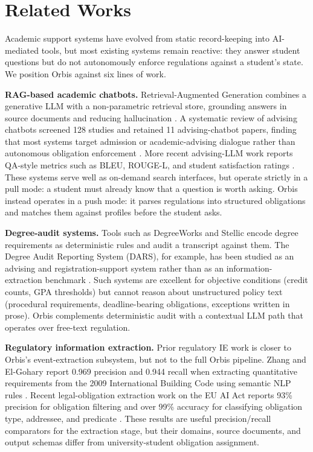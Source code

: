 \documentclass[a4paper,12pt]{article}
\begin{document}
\section{Related Works}
\label{sec:related}
Academic support systems have evolved from static record-keeping into AI-mediated tools, but most existing systems remain reactive: they answer student questions but do not autonomously enforce regulations against a student's state. We position Orbis against six lines of work.

\textbf{RAG-based academic chatbots.} Retrieval-Augmented Generation combines a generative LLM with a non-parametric retrieval store, grounding answers in source documents and reducing hallucination \cite{lewis2020retrieval}. A systematic review of advising chatbots screened 128 studies and retained 11 advising-chatbot papers, finding that most systems target admission or academic-advising dialogue rather than autonomous obligation enforcement \cite{assayed2024systematic}. More recent advising-LLM work reports QA-style metrics such as BLEU, ROUGE-L, and student satisfaction ratings \cite{ismail2025academic}. These systems serve well as on-demand search interfaces, but operate strictly in a pull mode: a student must already know that a question is worth asking. Orbis instead operates in a push mode: it parses regulations into structured obligations and matches them against profiles before the student asks.

\textbf{Degree-audit systems.} Tools such as DegreeWorks and Stellic encode degree requirements as deterministic rules and audit a transcript against them. The Degree Audit Reporting System (DARS), for example, has been studied as an advising and registration-support system rather than as an information-extraction benchmark \cite{wick2023dars}. Such systems are excellent for objective conditions (credit counts, GPA thresholds) but cannot reason about unstructured policy text (procedural requirements, deadline-bearing obligations, exceptions written in prose). Orbis complements deterministic audit with a contextual LLM path that operates over free-text regulation.

\textbf{Regulatory information extraction.} Prior regulatory IE work is closer to Orbis's event-extraction subsystem, but not to the full Orbis pipeline. Zhang and El-Gohary report 0.969 precision and 0.944 recall when extracting quantitative requirements from the 2009 International Building Code using semantic NLP rules \cite{zhang2016semantic}. Recent legal-obligation extraction work on the EU AI Act reports 93\% precision for obligation filtering and over 99\% accuracy for classifying obligation type, addressee, and predicate \cite{galli2025aiAct}. These results are useful precision/recall comparators for the extraction stage, but their domains, source documents, and output schemas differ from university-student obligation assignment.
\end{document}
